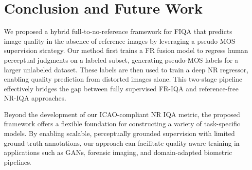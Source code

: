 \section{Conclusion and Future Work}

We proposed a hybrid full-to-no-reference framework for FIQA that predicts image quality in the absence of reference images by leveraging a pseudo-MOS supervision strategy. Our method first trains a FR fusion model to regress human perceptual judgments on a labeled subset, generating pseudo-MOS labels for a larger unlabeled dataset. These labels are then used to train a deep NR regressor, enabling quality prediction from distorted images alone. This two-stage pipeline effectively bridges the gap between fully supervised FR-IQA and reference-free NR-IQA approaches.

Beyond the development of our ICAO-compliant NR IQA metric, the proposed framework offers a flexible foundation for constructing a variety of task-specific models. By enabling scalable, perceptually grounded supervision with limited ground-truth annotations, our approach can facilitate quality-aware training in applications such as GANs, forensic imaging, and domain-adapted biometric pipelines.